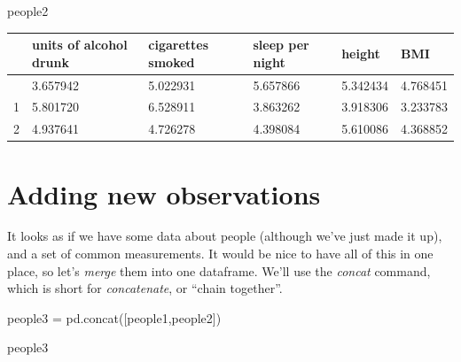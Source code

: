\documentclass[
  letterpaper,
  DIV=11,
  numbers=noendperiod]{scrreprt}
\newenvironment{Shaded}{\begin{snugshade}}{\end{snugshade}}
\newcommand{\NormalTok}[1]{\textcolor[rgb]{0.00,0.23,0.31}{#1}}
\newcommand{\OperatorTok}[1]{\textcolor[rgb]{0.37,0.37,0.37}{#1}}
\begin{document}
\begin{Shaded}
\begin{Highlighting}[]
\NormalTok{people2}
\end{Highlighting}
\end{Shaded}

\begin{longtable}[]{@{}llllll@{}}
\toprule\noalign{}
& units of alcohol drunk & cigarettes smoked & sleep per night & height
& BMI \\
\midrule\noalign{}
\endhead
\bottomrule\noalign{}
\endlastfoot
0 & 3.657942 & 5.022931 & 5.657866 & 5.342434 & 4.768451 \\
1 & 5.801720 & 6.528911 & 3.863262 & 3.918306 & 3.233783 \\
2 & 4.937641 & 4.726278 & 4.398084 & 5.610086 & 4.368852 \\
\end{longtable}


\hypertarget{adding-new-observations}{%
\chapter{Adding new observations}\label{adding-new-observations}}

It looks as if we have some data about people (although we've just made
it up), and a set of common measurements. It would be nice to have all
of this in one place, so let's \emph{merge} them into one dataframe.
We'll use the \emph{concat} command, which is short for
\emph{concatenate}, or ``chain together''.

\begin{Shaded}
\begin{Highlighting}[]
\NormalTok{people3 }\OperatorTok{=}\NormalTok{ pd.concat([people1,people2])}
\end{Highlighting}
\end{Shaded}

\begin{Shaded}
\begin{Highlighting}[]
\NormalTok{people3}
\end{Highlighting}
\end{Shaded}
\end{document}
